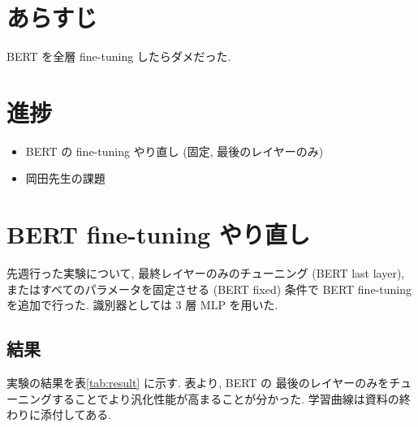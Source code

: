 \documentclass[twocolumn]{jarticle}     %
\begin{document}

\section{あらすじ}
BERT\cite{BERT} を全層 fine-tuning したらダメだった.

\section{進捗}

\begin{itemize}
  \item BERT の fine-tuning やり直し (固定, 最後のレイヤーのみ)
  \item 岡田先生の課題
\end{itemize}

\section{BERT fine-tuning やり直し}

先週行った実験について, 最終レイヤーのみのチューニング (BERT last layer), またはすべてのパラメータを固定させる (BERT fixed) 条件で BERT fine-tuning を追加で行った.
識別器としては 3 層 MLP を用いた.

\subsection{結果}
実験の結果を表\ref{tab:result} に示す.
表より, BERT の 最後のレイヤーのみをチューニングすることでより汎化性能が高まることが分かった. 学習曲線は資料の終わりに添付してある.
\end{document}
